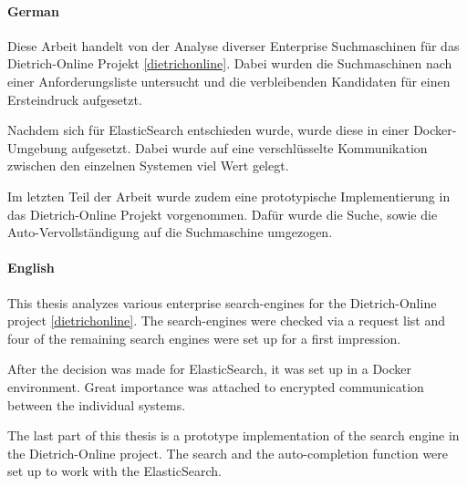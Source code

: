 \kurzfassung

\paragraph*{German}
Diese Arbeit handelt von der Analyse diverser Enterprise Suchmaschinen für das Dietrich-Online Projekt \ref{dietrichonline}. Dabei wurden die Suchmaschinen nach einer Anforderungsliste untersucht und die verbleibenden Kandidaten für einen Ersteindruck aufgesetzt. 

Nachdem sich für ElasticSearch entschieden wurde, wurde diese in einer Docker-Umgebung aufgesetzt. Dabei wurde auf eine verschlüsselte Kommunikation zwischen den einzelnen Systemen viel Wert gelegt.

Im letzten Teil der Arbeit wurde zudem eine prototypische Implementierung in das Dietrich-Online Projekt vorgenommen. Dafür wurde die Suche, sowie die Auto-Vervollständigung auf die Suchmaschine umgezogen.

\paragraph*{English}

This thesis analyzes various enterprise search-engines for the Dietrich-Online project \ref{dietrichonline}. The search-engines were checked via a request list and four of the remaining search engines were set up for a first impression.

After the decision was made for ElasticSearch, it was set up in a Docker environment. Great importance was attached to encrypted communication between the individual systems.

The last part of this thesis is a prototype implementation of the search engine in the Dietrich-Online project. The search and the auto-completion function were set up to work with the ElasticSearch.